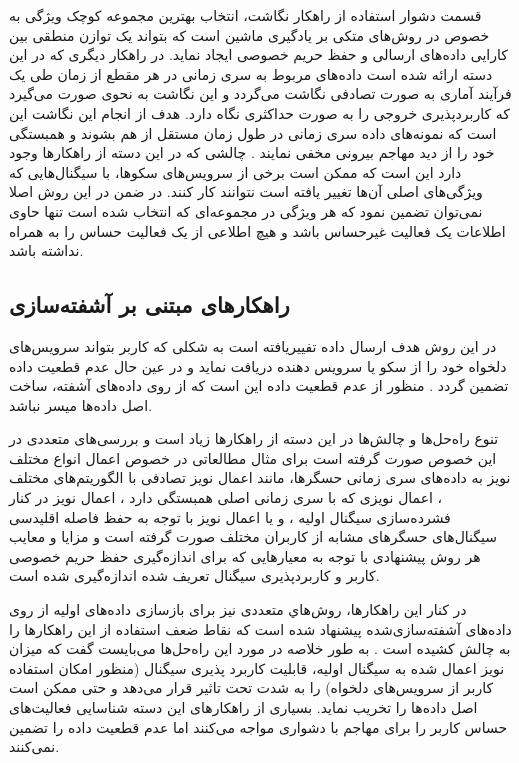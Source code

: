 قسمت دشوار استفاده از راهکار نگاشت، انتخاب بهترين مجموعه کوچک ويژگی به خصوص در روش‌های متکی بر يادگيری ماشين است که بتواند يک توازن منطقی بين کارایی داده‌‌‌های ارسالی و حفظ حریم خصوصی ايجاد نمايد. در راهکار ديگری که در اين دسته ارائه شده است داده‌‌‌های مربوط به سری زمانی در هر مقطع از زمان طی یک فرآیند آماری به صورت تصادفی نگاشت می‌‌‌گردد و اين نگاشت به نحوی صورت می‌‌‌گیرد که کاربردپذيری خروجی را به صورت حداکثری نگاه دارد. هدف از انجام اين نگاشت اين است که نمونه‌‌‌های داده سری‌‌‌ زمانی در طول زمان مستقل از هم بشوند و همبستگی خود را از ديد مهاجم بیرونی مخفی نمايند \cite{x3132}. چالشی که در این دسته از راهکارها وجود دارد این است که ممکن است برخی از سرويس‌های سکوها، با سيگنال‌هایی که ويژگی‌‌‌های اصلی آن‌ها تغییر يافته است نتوانند کار کنند. در ضمن در اين روش اصلا نمی‌‌‌توان تضمين نمود که هر ويژگی در مجموعه‌‌‌ای که انتخاب شده است تنها حاوی اطلاعات يک فعاليت غیرحساس باشد و هيچ اطلاعی از يک فعاليت حساس را به همراه نداشته باشد. 

\subsection{راهکارهای مبتنی بر آشفته‌سازی}

در اين روش هدف ارسال داده تفییریافته است به شکلی که کاربر بتواند سرویس‌های دلخواه خود را از سکو یا سرویس دهنده دریافت نماید و در عین حال عدم قطعیت داده تضمین گردد \cite{x3111}. منظور از عدم قطعیت داده اين است که از روی داده‌‌‌های آشفته، ساخت اصل داده‌‌‌ها میسر نباشد. 

تنوع راه‌‌‌حل‌‌‌ها و چالش‌ها در این دسته از راهکارها زیاد است و بررسی‌‌‌های متعددی در اين خصوص صورت گرفته است برای مثال مطالعاتی در خصوص اعمال انواع مختلف نويز به داده‌‌‌های سری زمانی حسگرها، مانند اعمال نویز تصادفی با الگوریتم‌های مختلف \cite{x3113,x3112}، اعمال نویزی که با سری زمانی اصلی همبستگی دارد \cite{x3114}، اعمال نویز در کنار فشرده‌‌‌سازی سیگنال اولیه \cite{x3113}، و یا اعمال نویز با توجه به حفظ فاصله اقلیدسی‌‌‌ سیگنال‌های حسگرهای مشابه از کاربران مختلف \cite{x3112} صورت گرفته است و مزایا و معایب هر روش پیشنهادی با توجه به معیارهایی که برای اندازه‌‌‌گیری حفظ حریم خصوصی کاربر و کاربردپذیری سیگنال تعریف شده اندازه‌‌‌گیری شده است. 

در کنار این راهکارها، روش‌هاي متعددی نيز برای بازسازی داده‌‌‌های اولیه از روی داده‌‌‌های آشفته‌سازی‌شده پيشنهاد شده است که نقاط ضعف استفاده از این راهکارها را به چالش کشیده است \cite{x3112,x3115,x3116}. به طور خلاصه در مورد این راه‌‌‌حل‌ها می‌‌‌بایست گفت که میزان نویز اعمال شده به سیگنال اولیه، قابلیت کاربرد پذیری سیگنال (منظور امکان استفاده کاربر از سرویس‌های دلخواه) را به شدت تحت تاثیر قرار می‌‌‌دهد و حتی ممکن است اصل داده‌‌‌ها را تخریب نماید. بسیاری از راهکارهای این دسته شناسایی فعاليت‌های حساس کاربر را برای مهاجم با دشواری مواجه می‌‌‌کنند اما عدم قطعیت داده را تضمین نمی‌‌‌کنند.

